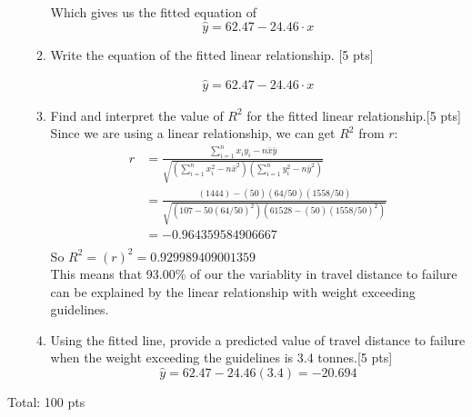 \documentclass[11pt]{article}\usepackage[]{graphicx}\usepackage[]{color}
\begin{document}
\begin{enumerate}
\begin{enumerate}
      Which gives us the fitted equation of
      $$
      \hat{y} = 62.47 -24.46 \cdot x
      $$


      \item Write the equation of the fitted linear relationship. [5 pts] 

          \begin{align*}
          \hat{y} = 62.47 -24.46 \cdot x
          \end{align*}

      \item Find and interpret the value of $R^2$ for the fitted linear relationship.[5 pts]\\

            Since we are using a linear relationship, we can get $R^2$ from $r$:
            \begin{align*} 
            r &= \frac{\sum_{i=1}^n x_i y_i - n \bar{x} \bar{y}}{\sqrt{\left(\sum_{i=1}^n x_i^2 - n \bar{x}^2\right)\left(\sum_{i=1}^n y_i^2 - n\bar{y}^2\right)}} \\
              &= \frac{(1444) - (50) (64/50) (1558/50) }{\sqrt{\left(107 - 50 (64/50)^2 \right)\left(61528 - (50)(1558/50)^2\right)}} \\
              &= -0.964359584906667 \\
            \end{align*} 
            So $R^2 = (r)^2 = 0.929989409001359$\\
            
               This means that 93.00\% of our the variablity in travel distance to failure can be explained by the linear relationship with weight exceeding guidelines.


      \item Using the fitted line, provide a predicted value of travel distance to failure when the weight exceeding the guidelines is 3.4 tonnes.[5 pts]\\
         $$ \hat{y} = 62.47 - 24.46(3.4) = -20.694 $$

% 
% 
% 
% 

\end{enumerate}

\end{enumerate}	

Total: 100 pts
\end{document}
